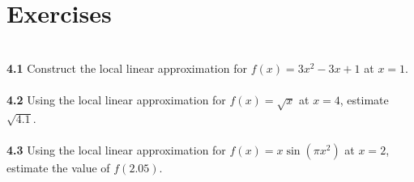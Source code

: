 \documentclass[11pt]{scrartcl}
\begin{document}
\section{Exercises}\\
\noindent 
\textbf{4.1} Construct the local linear approximation for $f(x)=3x^2-3x+1$ at $x=1$.\\
\\
\noindent 
\textbf{4.2} Using the local linear approximation for $f(x)=\sqrt x$ at $x=4$, estimate $\sqrt {4.1}$. \\
\\
\noindent 
\textbf{4.3} Using the local linear approximation for $f(x)=x\sin(\pi x^2)$ at $x=2$, estimate the value of $f(2.05)$. 
\end{document}
